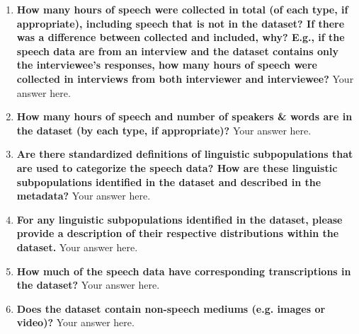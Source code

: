 \documentclass{article}
\begin{document}
    \begin{enumerate}[leftmargin=0.65cm]
    \scriptsize
      
        \item \textbf{How many hours of speech were collected in total (of each type, if appropriate), including speech that is not in the dataset? If there was a difference between collected and included, why? E.g., if the speech data are from an interview and the dataset contains only the interviewee's responses, how many hours of speech were collected in interviews from both interviewer and interviewee?}
        \newline 
        Your answer here.
        \newline 
     
        \item \textbf{How many hours of speech and number of speakers & words are in the dataset (by each type, if appropriate)?} 
        \newline 
        Your answer here.
        \newline 
        
        \item \textbf{Are there standardized definitions of linguistic subpopulations that are used to categorize the speech data? How are these linguistic subpopulations identified in the dataset and described in the metadata?}
        \newline 
        Your answer here.
        \newline 
        
        \item \textbf{For any linguistic subpopulations identified in the dataset, please provide a description of their respective distributions within the dataset.}
        \newline 
        Your answer here.
        \newline 
       
        \item \textbf{How much of the speech data have corresponding transcriptions in the dataset?}
        \newline 
        Your answer here.
        \newline 
        
        \item \textbf{Does the dataset contain non-speech mediums (e.g. images or video)?}
        \newline 
        Your answer here.
        \newline 
        

\end{enumerate}
\end{document}
